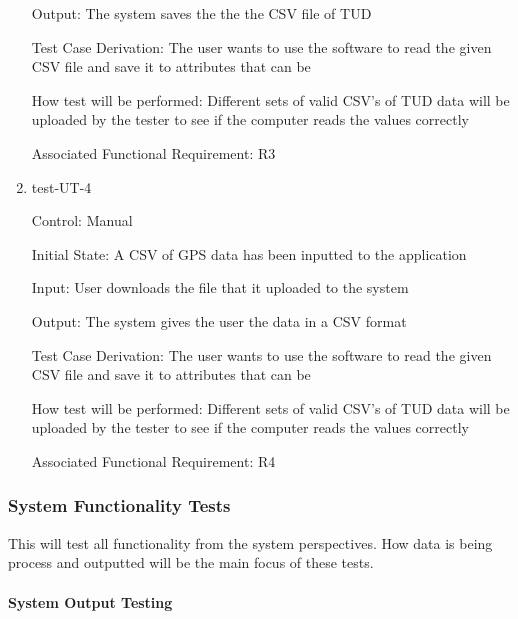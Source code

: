 \documentclass[12pt, titlepage]{article}
\begin{document}
\begin{enumerate}
Output: The system saves the the the CSV file of TUD

Test Case Derivation: The user wants to use the software to read the given CSV file and save it to attributes that can be 
					
How test will be performed: Different sets of valid CSV's of TUD data will be uploaded by the tester to see if the computer reads the values correctly

Associated Functional Requirement: R3

\item{test-UT-4\\}

Control: Manual 
					
Initial State: A CSV of GPS data has been inputted to the application
					
Input: User downloads the file that it uploaded to the system 
					
Output: The system gives the user the data in a CSV format 

Test Case Derivation: The user wants to use the software to read the given CSV file and save it to attributes that can be 
					
How test will be performed: Different sets of valid CSV's of TUD data will be uploaded by the tester to see if the computer reads the values correctly

Associated Functional Requirement: R4
\end{enumerate}

\subsubsection{System Functionality Tests}

This will test all functionality from the system perspectives. How data is being process and outputted will be the main focus of these tests. 
		
\paragraph{System Output Testing}
\end{document}
